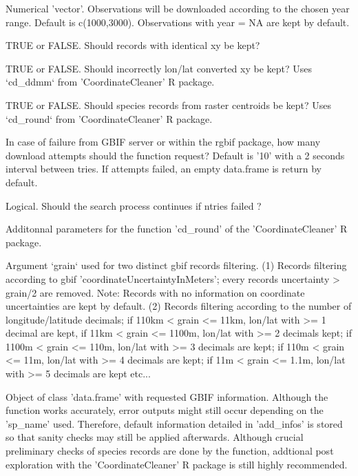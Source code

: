 \documentclass[a4paper]{book}
\begin{document}
\begin{Arguments}
\begin{ldescription}
\item[\code{time\_period}] Numerical 'vector'. Observations will be downloaded according to the chosen
year range. Default is c(1000,3000). Observations with year = NA are kept by default.

\item[\code{identic\_xy}] TRUE or FALSE. Should records with identical xy be kept?

\item[\code{wConverted\_xy}] TRUE or FALSE. Should incorrectly lon/lat converted xy be kept?
Uses `cd\_ddmm` from 'CoordinateCleaner' R package.

\item[\code{centroids}] TRUE or FALSE. Should species records from raster centroids be kept?
Uses `cd\_round` from 'CoordinateCleaner' R package.

\item[\code{ntries}] In case of failure from GBIF server or within the rgbif package, how many
download attempts should the function request? Default is '10' with a 2 seconds interval
between tries. If attempts failed, an empty data.frame is return by default.

\item[\code{error.skip}] Logical. Should the search process continues if ntries failed ?

\item[\code{...}] Additonnal parameters for the function 'cd\_round' of the 'CoordinateCleaner'
R package.
\end{ldescription}
\end{Arguments}
%
\begin{Details}\relax
Argument `grain` used for two distinct gbif records filtering. (1) Records filtering
according to gbif 'coordinateUncertaintyInMeters'; every records uncertainty > grain/2
are removed. Note: Records with no information on coordinate uncertainties are kept by
default. (2) Records filtering according to the number of longitude/latitude decimals;
if 110km < grain <= 11km, lon/lat with >= 1 decimal are kept, if 11km < grain <= 1100m,
lon/lat with >= 2 decimals kept; if 1100m < grain <= 110m, lon/lat with >= 3 decimals
are kept; if 110m < grain <= 11m, lon/lat with >= 4 decimals are kept;
if 11m < grain <= 1.1m, lon/lat with >= 5 decimals are kept etc...
\end{Details}
%
\begin{Value}
Object of class 'data.frame' with requested GBIF information. Although the function
works accurately, error outputs might still occur depending on the 'sp\_name' used.
Therefore, default information detailed in 'add\_infos' is stored so that sanity checks
may still be applied afterwards. Although crucial preliminary checks of species records
are done by the function, addtional post exploration with the 'CoordinateCleaner' R
package is still highly recommended.
\end{Value}
\end{document}
